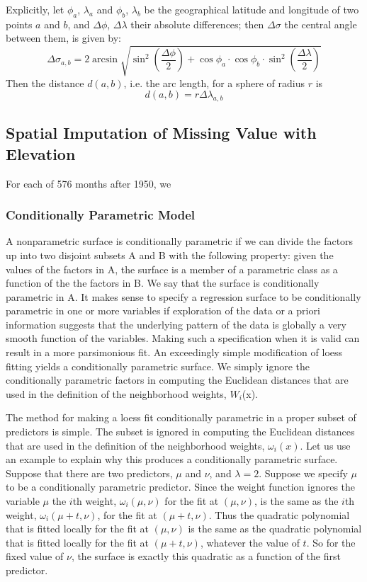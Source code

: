 Explicitly, let $\phi_a$, $\lambda_a$ and $\phi_b$, $\lambda_b$ be the geographical 
latitude and longitude of two points $a$ and $b$, and $\Delta \phi$, 
$\Delta \lambda$ their absolute differences; then $\Delta \sigma$ the central angle 
between them, is given by:
$$
\Delta \sigma_{a,b} = 2 \arcsin \sqrt{ \sin^2 ( \frac{\Delta \phi}{2} ) + \cos 
\phi_a \cdot \cos \phi_b \cdot \sin^2 ( \frac{\Delta \lambda}{2} )}
$$ 
Then the distance $d(a,b)$, i.e. the arc length, for a sphere of radius $r$ is
$$
d(a,b) = r \Delta \lambda_{a,b}
$$

\subsection{Spatial Imputation of Missing Value with Elevation}

For each of 576 months after 1950, we 

\subsubsection{Conditionally Parametric Model}

A nonparametric surface is conditionally
parametric if we can divide the factors up into two disjoint subsets
A and B with the following property: given the values of the factors in A,
the surface is a member of a parametric class as a function of the the factors
in B. We say that the surface is conditionally parametric in A.
It makes sense to specify a regression surface to be conditionally parametric
in one or more variables if exploration of the data or a priori information
suggests that the underlying pattern of the data is globally a very smooth
function of the variables. Making such a specification when it is valid can
result in a more parsimonious fit.
An exceedingly simple modification of loess fitting yields a conditionally
parametric surface. We simply ignore the conditionally parametric factors
in computing the Euclidean distances that are used in the definition of the
neighborhood weights, $W_i$(x).

The method for making a loess fit conditionally parametric in a proper subset of
predictors is simple. The subset is ignored in computing the Euclidean distances 
that are used in the definition of the neighborhood weights, $\omega_i(x)$. Let 
us use an example to explain why this produces a conditionally parametric surface. 
Suppose that there are two predictors, $\mu$ and $\nu$, and $\lambda=2$. Suppose 
we specify $\mu$ to be a conditionally parametric predictor. Since the weight 
function ignores the variable $\mu$ the $i$th weight, $\omega_i(\mu, \nu)$ for 
the fit at $(\mu, \nu)$, is the same as the $i$th weight, $\omega_i(\mu+t, \nu)$, 
for the fit at $(\mu+t, \nu)$. Thus the quadratic polynomial that is fitted locally 
for the fit at $(\mu, \nu)$ is the same as the quadratic polynomial that is fitted 
locally for the fit at $(\mu+t, \nu)$, whatever the value of $t$. So for the fixed 
value of $\nu$, the surface is exactly this quadratic as a function of the first 
predictor.


